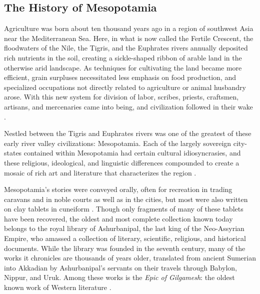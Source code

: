 \documentclass[10pt,a4paper]{article}
\begin{document}
\subsection{The History of Mesopotamia}
%
%
Agriculture was born about ten thousand years ago in a region of southwest Asia near the Mediterranean Sea. Here, in what is now called the Fertile Crescent, the floodwaters of the Nile, the Tigris, and the Euphrates rivers annually deposited rich nutrients in the soil, creating a sickle-shaped ribbon of arable land in the otherwise arid landscape. As techniques for cultivating the land became more efficient, grain surpluses necessitated less emphasis on food production, and specialized occupations not directly related to agriculture or animal husbandry arose. With this new system for division of labor, scribes, priests, craftsmen, artisans, and mercenaries came into being, and civilization followed in their wake \cite{nelson2015}. 

Nestled between the Tigris and Euphrates rivers was one of the greatest of these early river valley civilizations: Mesopotamia. Each of the largely sovereign city-states contained within Mesopotamia had certain cultural idiosyncrasies, and these religious, ideological, and linguistic differences compounded to create a mosaic of rich art and literature that characterizes the region \cite{van1997ancient}. 

Mesopotamia’s stories were conveyed orally, often for recreation in trading caravans and in noble courts as well as in the cities, but most were also written on clay tablets in cuneiform \cite{dalley2000myths}. Though only fragments of many of these tablets have been recovered, the oldest and most complete collection known today belongs to the royal library of Ashurbanipal, the last king of the Neo-Assyrian Empire, who amassed a collection of literary, scientific, religious, and historical documents. While the library was founded in the seventh century, many of the works it chronicles are thousands of years older, translated from ancient Sumerian into Akkadian by Ashurbanipal’s servants on their travels through Babylon, Nippur, and Uruk. Among these works is the \emph{Epic of Gilgamesh}: the oldest known work of Western literature \cite{sandars1972epic}.
\end{document}
